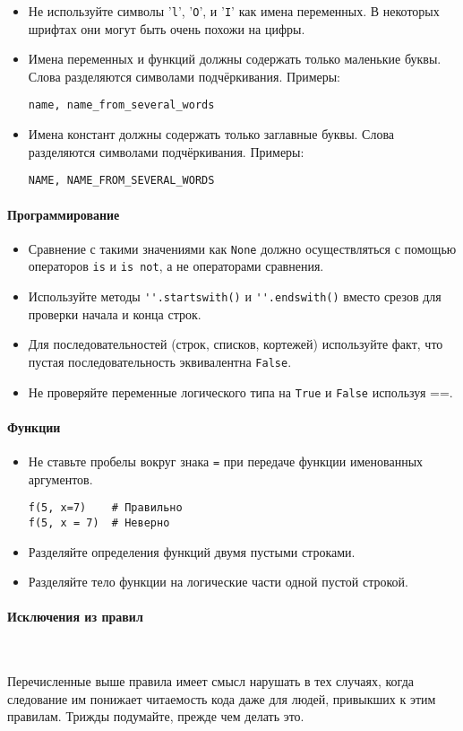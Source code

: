\documentclass[a4paper, 12pt]{article}
\begin{document}
\begin{itemize}
	\item Не используйте символы '\lstinline{l}', '\lstinline{O}', и '\lstinline{I}' как имена переменных. В некоторых шрифтах они могут быть очень похожи на цифры.

	\item Имена переменных и функций должны содержать только маленькие буквы. Слова разделяются символами подчёркивания. Примеры:
	\begin{lstlisting}
name, name_from_several_words
	\end{lstlisting}

	\item Имена констант должны содержать только заглавные буквы. Слова разделяются символами подчёркивания. Примеры:
	\begin{lstlisting}
NAME, NAME_FROM_SEVERAL_WORDS
	\end{lstlisting}
\end{itemize}

\paragraph{Программирование}

\begin{itemize}
	\item Сравнение с такими значениями как \lstinline{None} должно осуществляться с помощью операторов \lstinline{is} и \lstinline{is not}, а не операторами сравнения.
	\item Используйте методы \lstinline{''.startswith()} и \lstinline{''.endswith()} вместо срезов для проверки начала и конца строк.
	\item Для последовательностей (строк, списков, кортежей) используйте факт, что пустая последовательность эквивалентна \lstinline{False}.
	\item Не проверяйте переменные логического типа на \lstinline{True} и \lstinline{False} используя ==.
\end{itemize}

\paragraph{Функции}

\begin{itemize}
	\item Не ставьте пробелы вокруг знака \lstinline{=} при передаче функции именованных аргументов.
	\begin{lstlisting}[texcl]
f(5, x=7)    # Правильно
f(5, x = 7)  # Неверно
	\end{lstlisting}

	\item Разделяйте определения функций двумя пустыми строками.

	\item Разделяйте тело функции на логические части одной пустой строкой.
\end{itemize}

\paragraph{Исключения из правил} \

Перечисленные выше правила имеет смысл нарушать в тех случаях, когда следование им понижает читаемость кода даже для людей, привыкших к этим правилам. Трижды подумайте, прежде чем делать это.
\end{document}

